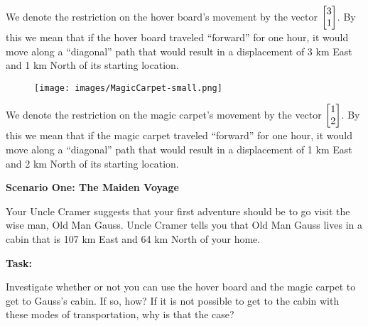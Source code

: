\begin{iola}
\begin{minipage}{\textwidth}
	We denote the restriction on the hover board's movement by the vector
	$\mat{3 \\1}$. By this we mean that if
	the hover board traveled ``forward'' for one hour, it would move along a
	``diagonal'' path that would result in a displacement of 3 km East and
	1 km North of its starting location.
\end{minipage}

\begin{minipage}{\textwidth}
	\vspace{.5cm}
	\begin{wrapfigure}{l}{1in}
	\vspace{-.8cm}
	\texttt{[image: images/MagicCarpet-small.png]}
	\end{wrapfigure}

	We denote the restriction on the magic carpet's movement by the vector
	$\mat{1 \\2 }$. By this we mean that if the
	magic carpet traveled ``forward'' for one hour, it would move along a
	``diagonal'' path that would result in a displacement of 1 km East and
	2 km North of its starting location.
\end{minipage}


\vspace{10mm}

\textbf{Scenario One: The Maiden Voyage}

Your Uncle Cramer suggests that your first adventure should be to go visit
the wise man, Old Man Gauss. Uncle Cramer tells you that Old Man Gauss
lives in a cabin that is 107 km East and 64 km North of your home.

\vspace{5mm}

\textbf{Task:}
\par
Investigate whether or not you can use the hover board and the magic
carpet to get to Gauss's cabin. If so, how? If it is not possible to
get to the cabin with these modes of transportation, why is that the case?

\end{iola}

